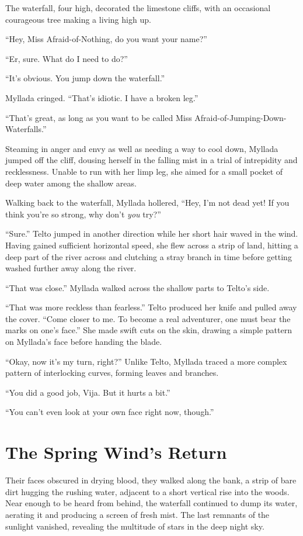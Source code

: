 The waterfall, four \veti{} high, decorated the limestone cliffs, with an occasional courageous tree making a living high up.

``Hey, Miss Afraid-of-Nothing, do you want your name?''

``Er, sure. What do I need to do?''

``It's obvious. You jump down the waterfall.''

Myllada cringed. ``That's idiotic. I have a broken leg.''

``That's great, as long as you want to be called Miss Afraid-of-Jumping-Down-Waterfalls.''

Steaming in anger and envy as well as needing a way to cool down, Myllada jumped off the cliff, dousing herself in the falling mist in a trial of intrepidity and recklessness. Unable to run with her limp leg, she aimed for a small pocket of deep water among the shallow areas.

Walking back to the waterfall, Myllada hollered, ``Hey, I'm not dead yet! If you think you're so strong, why don't \emph{you} try?''

``Sure.'' Telto jumped in another direction while her short hair waved in the wind. Having gained sufficient horizontal speed, she flew across a strip of land, hitting a deep part of the river across and clutching a stray branch in time before getting washed further away along the river.

``That was close.'' Myllada walked across the shallow parts to Telto's side.

``That was more reckless than fearless.'' Telto produced her knife and pulled away the cover. ``Come closer to me. To become a real adventurer, one must bear the marks on one's face.'' She made swift cuts on the skin, drawing a simple pattern on Myllada's face before handing the blade.

``Okay, now it's my turn, right?'' Unlike Telto, Myllada traced a more complex pattern of interlocking curves, forming leaves and branches.

``You did a good job, Vija. But it hurts a bit.''

``You can't even look at your own face right now, though.''

\chapter{The Spring Wind's Return}

Their faces obscured in drying blood, they walked along the bank, a strip of bare dirt hugging the rushing water, adjacent to a short vertical rise into the woods. Near enough to be heard from behind, the waterfall continued to dump its water, aerating it and producing a screen of fresh mist. The last remnants of the sunlight vanished, revealing the multitude of stars in the deep night sky.

